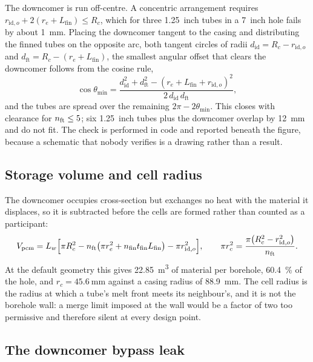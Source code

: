 The downcomer is run off-centre. A concentric arrangement requires
$r_{\mathrm{id},o} + 2(r_e + L_{\mathrm{fin}}) \le R_c$, which for three
\SI{1.25}{inch} tubes in a \SI{7}{inch} hole fails by about
\SI{1}{\milli\metre}. Placing the downcomer tangent to the casing and
distributing the finned tubes on the opposite arc, both tangent circles of
radii $d_{\mathrm{id}} = R_c - r_{\mathrm{id},o}$ and
$d_{\mathrm{ft}} = R_c - (r_e + L_{\mathrm{fin}})$, the smallest angular
offset that clears the downcomer follows from the cosine rule,
\begin{equation}
\cos\theta_{\min} = \frac{d_{\mathrm{id}}^{2} + d_{\mathrm{ft}}^{2}
  - (r_e + L_{\mathrm{fin}} + r_{\mathrm{id},o})^{2}}
  {2\,d_{\mathrm{id}}\,d_{\mathrm{ft}}},
\end{equation}
and the tubes are spread over the remaining $2\pi - 2\theta_{\min}$. This
closes with clearance for $n_{\mathrm{ft}} \le 5$; six \SI{1.25}{inch} tubes plus the
downcomer overlap by \SI{12}{\milli\metre} and do not fit. The check is
performed in code and reported beneath the figure, because a schematic that
nobody verifies is a drawing rather than a result.

\subsection{Storage volume and cell radius}

The downcomer occupies cross-section but exchanges no heat with the material
it displaces, so it is subtracted before the cells are formed rather than
counted as a participant:
\begin{equation}
V_{\mathrm{pcm}} = L_{w}\Big[\pi R_c^{2}
  - n_{\mathrm{ft}}\big(\pi r_e^{2} + n_{\mathrm{fin}} t_{\mathrm{fin}} L_{\mathrm{fin}}\big)
  - \pi r_{\mathrm{id},o}^{2}\Big],
\qquad
\pi r_c^{2} = \frac{\pi\big(R_c^{2} - r_{\mathrm{id},o}^{2}\big)}{n_{\mathrm{ft}}}.
\end{equation}
At the default geometry this gives \SI{22.85}{\metre\cubed} of material per
borehole, \SI{60.4}{\percent} of the hole, and $r_c = \SI{45.6}{\milli\metre}$
against a casing radius of \SI{88.9}{\milli\metre}. The cell radius is the
radius at which a tube's melt front meets its neighbour's, and it is not the
borehole wall: a merge limit imposed at the wall would be a factor of two too
permissive and therefore silent at every design point.

\subsection{The downcomer bypass leak}
\label{sec:bypass}

